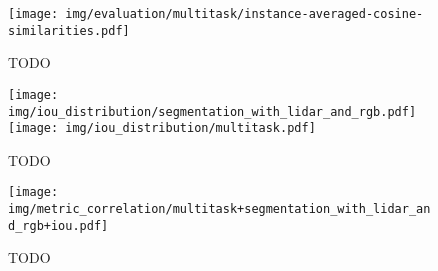 \begin{figure}
  \texttt{[image: img/evaluation/multitask/instance-averaged-cosine-similarities.pdf]}
  \caption{TODO}
\end{figure}

\begin{figure}
  \texttt{[image: img/iou\_distribution/segmentation\_with\_lidar\_and\_rgb.pdf]}
  \texttt{[image: img/iou\_distribution/multitask.pdf]}
  \caption{TODO}
\end{figure}

\begin{figure}
  \texttt{[image: img/metric\_correlation/multitask+segmentation\_with\_lidar\_and\_rgb+iou.pdf]}
  \caption{TODO}
\end{figure}
